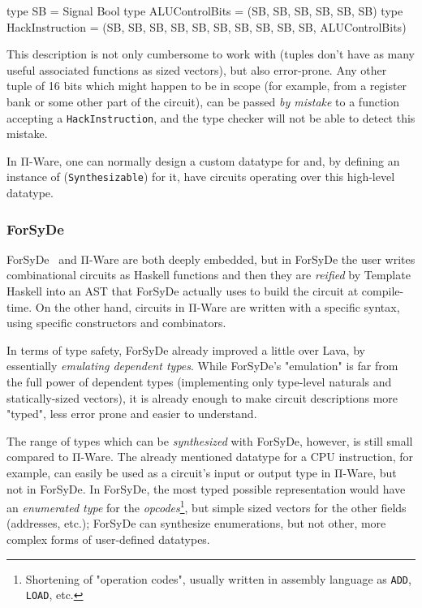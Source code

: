         \begin{haskellcode}
        type SB = Signal Bool
        type ALUControlBits = (SB, SB, SB, SB, SB, SB)
        type HackInstruction = (SB, SB, SB, SB, SB, SB, SB, SB, SB, SB, ALUControlBits)
        \end{haskellcode}

        This description is not only cumbersome to work with
        (tuples don't have as many useful associated functions as sized vectors),
        but also error-prone.
        Any other tuple of 16 bits which might happen to be in scope
        (for example, from a register bank or some other part of the circuit),
        can be passed \emph{by mistake} to a function accepting a \texttt{HackInstruction},
        and the type checker will not be able to detect this mistake.

        In Π-Ware, one can normally design a custom datatype for  and, by defining
        an instance of  (\texttt{Synthesizable}) for it, have circuits operating over this
        high-level datatype.

        \subsubsection{ForSyDe}
        \label{subsubsec:discussion-forsyde}
        ForSyDe~\cite{forsyde1999} and Π-Ware are both deeply embedded, but in ForSyDe the user
        writes combinational circuits as Haskell functions and then they are \emph{reified}
        by Template Haskell into an \ac{AST} that ForSyDe actually uses to build the circuit at compile-time.
        On the other hand, circuits in Π-Ware are written with a specific syntax, using specific constructors
        and combinators.

        In terms of type safety, ForSyDe already improved a little over Lava, by essentially
        \emph{emulating dependent types}.
        While ForSyDe's "emulation" is far from the full power of dependent types
        (implementing only type-level naturals and statically-sized vectors),
        it is already enough to make circuit descriptions more "typed", less error prone and
        easier to understand.

        The range of types which can be \emph{synthesized} with ForSyDe, however, is still small
        compared to Π-Ware. The already mentioned datatype for a CPU instruction, for example, can
        easily be used as a circuit's input or output type in Π-Ware, but not in ForSyDe.
        In ForSyDe, the most typed possible representation would have an \emph{enumerated type} for the
        \emph{opcodes}\footnote{Shortening of "operation codes",
            usually written in assembly language as \texttt{ADD}, \texttt{LOAD}, etc.},
        but simple sized vectors for the other fields (addresses, etc.);
        ForSyDe can synthesize enumerations, but not other, more complex forms of user-defined datatypes.

